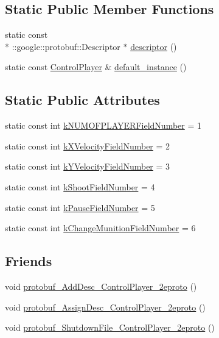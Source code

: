 \subsection*{Static Public Member Functions}
\begin{DoxyCompactItemize}
\item 
static const \\*
\-::google\-::protobuf\-::\-Descriptor $\ast$ \hyperlink{class_control_player_ac3b3c90e46a07ecabac236d5fd86ad2e}{descriptor} ()
\item 
static const \hyperlink{class_control_player}{Control\-Player} \& \hyperlink{class_control_player_ad03d0efd3008b639c64e3b2d09446f66}{default\-\_\-instance} ()
\end{DoxyCompactItemize}
\subsection*{Static Public Attributes}
\begin{DoxyCompactItemize}
\item 
static const int \hyperlink{class_control_player_aa22557ce6425dad4cb9bbee1c72ea009}{k\-N\-U\-M\-O\-F\-P\-L\-A\-Y\-E\-R\-Field\-Number} = 1
\item 
static const int \hyperlink{class_control_player_a2848d79ede088ee9d60163a1ce3debb5}{k\-X\-Velocity\-Field\-Number} = 2
\item 
static const int \hyperlink{class_control_player_a23d77701b2b3c5dcac4c23346e3d8008}{k\-Y\-Velocity\-Field\-Number} = 3
\item 
static const int \hyperlink{class_control_player_a110d46cbecf8ad2123381abec49cd20e}{k\-Shoot\-Field\-Number} = 4
\item 
static const int \hyperlink{class_control_player_a5172a9b73b225248c7b0cbc66da6d82a}{k\-Pause\-Field\-Number} = 5
\item 
static const int \hyperlink{class_control_player_a36f1942f704fa75ce19b13c1d19f9f26}{k\-Change\-Munition\-Field\-Number} = 6
\end{DoxyCompactItemize}
\subsection*{Friends}
\begin{DoxyCompactItemize}
\item 
void \hyperlink{class_control_player_aac621462a97f97bc512d44b05584fdf5}{protobuf\-\_\-\-Add\-Desc\-\_\-\-Control\-Player\-\_\-2eproto} ()
\item 
void \hyperlink{class_control_player_a21a35d7e412b7505004e6d3230169a28}{protobuf\-\_\-\-Assign\-Desc\-\_\-\-Control\-Player\-\_\-2eproto} ()
\item 
void \hyperlink{class_control_player_ae1feb442f59225a94fe4948ff34349a6}{protobuf\-\_\-\-Shutdown\-File\-\_\-\-Control\-Player\-\_\-2eproto} ()
\end{DoxyCompactItemize}


